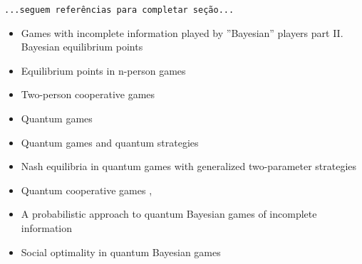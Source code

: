 \documentclass[
	article,			        %
	11pt,				          %
	oneside,			        %
	a4paper,			        %
	english,			        %
	brazil,				        %
	sumario=tradicional
]{abntex2}\usepackage[]{graphicx}\usepackage[]{color}
\begin{document}
  \texttt{\color{red}...seguem referências para completar seção...}
  \begin{itemize}
    \item Games with incomplete information played by ''Bayesian'' players part II. Bayesian equilibrium points \cite{Harsanyi.1968}
    \item Equilibrium points in n-person games \cite{Nash.1950}
    \item Two-person cooperative games \cite{Nash.1953}
    \item Quantum games \cite{JoseFigueiredo.2004}
    \item Quantum games and quantum strategies \cite{Eisert.1999}
    \item Nash equilibria in quantum games with generalized two-parameter strategies \cite{Flitney.2007}
    \item Quantum cooperative games \cite{Iqbal.2002},\cite{Dai.2004}
    \item A probabilistic approach to quantum Bayesian games of incomplete information \cite{Iqbal.2014}
    \item Social optimality in quantum Bayesian games \cite{Azhar.2015}
  \end{itemize}

\postextual





\end{document}
